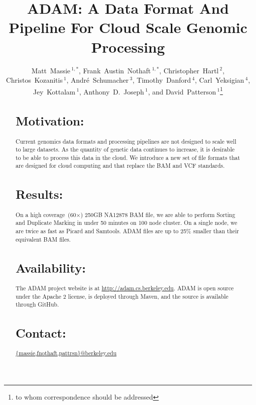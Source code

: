 \documentclass{bioinfo}
\begin{document}

\title[ADAM: Cloud Scale Genomic Processing]{ADAM: A Data Format And Pipeline For Cloud Scale Genomic Processing}
\author[Massie \textit{et~al}]{Matt~Massie\,$^{1,*}$, Frank~Austin~Nothaft\,$^{1,*}$, Christopher~Hartl\,$^{2}$, Christos~Kozanitis\,$^1$,
Andr\'{e}~Schumacher\,$^3$, Timothy~Danford\,$^4$, Carl~Yeksigian\,$^4$, Jey~Kottalam\,$^1$, Anthony~D.~Joseph\,$^1$,
and David~Patterson$\,^1$\footnote{to whom correspondence should be addressed}}
\address{$^{1}$Department of Electrical Engineering and Computer Science, University of California, Berkeley\\
$^{2}$The Broad Institute of MIT and Harvard\\
$^{3}$International Computer Science Institute (ICSI), University of California, Berkeley\\
$^{4}$GenomeBridge, Cambridge, MA}



\maketitle

\begin{abstract}

\section{Motivation:}
Current genomics data formats and processing pipelines are not designed to scale well to large datasets. As the quantity of genetic
data continues to increase, it is desirable to be able to process this data in the cloud. We introduce a new set of file formats that are
designed for cloud computing and that replace the BAM and VCF standards.

\section{Results:} On a high coverage~(60$\times$) 250GB NA12878 BAM file, we are able to perform Sorting and Duplicate Marking in under
50 minutes on 100 node cluster. On a single node, we are twice as fast as Picard and Samtools. ADAM files are up to 25\% smaller than
their equivalent BAM files.

\section{Availability:}
The ADAM project website is at \url{http://adam.cs.berkeley.edu}. ADAM is open source under the Apache 2 license, is deployed through Maven,
and the source is available through GitHub.

\section{Contact:} \href{massie@berkeley.edu}{\{massie,fnothaft,pattrsn\}@berkeley.edu}
\end{abstract}
\end{document}
